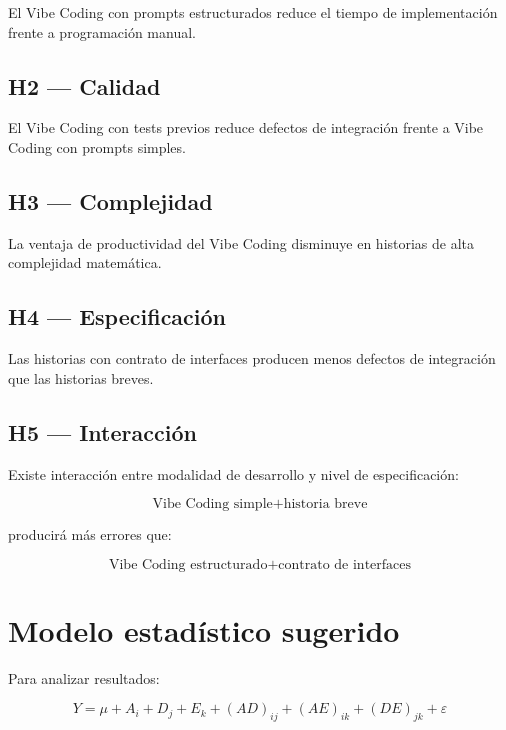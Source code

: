 \documentclass[11pt,a4paper]{article}
\begin{document}
El Vibe Coding con prompts estructurados reduce el tiempo de implementaci\'on frente a programaci\'on manual.

\subsection{H2 --- Calidad}

El Vibe Coding con tests previos reduce defectos de integraci\'on frente a Vibe Coding con prompts simples.

\subsection{H3 --- Complejidad}

La ventaja de productividad del Vibe Coding disminuye en historias de alta complejidad matem\'atica.

\subsection{H4 --- Especificaci\'on}

Las historias con contrato de interfaces producen menos defectos de integraci\'on que las historias breves.

\subsection{H5 --- Interacci\'on}

Existe interacci\'on entre modalidad de desarrollo y nivel de especificaci\'on:

\begin{equation}
\text{Vibe Coding simple} + \text{historia breve}
\end{equation}

producir\'a m\'as errores que:

\begin{equation}
\text{Vibe Coding estructurado} + \text{contrato de interfaces}
\end{equation}

\section{Modelo estad\'istico sugerido}

Para analizar resultados:

\begin{equation}
Y =
\mu
+ A_i
+ D_j
+ E_k
+ (A D)_{ij}
+ (A E)_{ik}
+ (D E)_{jk}
+ \varepsilon
\end{equation}
\end{document}
